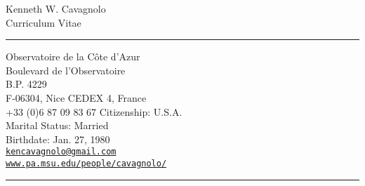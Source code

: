 \documentclass[12pt]{cv}
\begin{document}
\begin{center}
{\Large Kenneth W. Cavagnolo\\Curriculum Vitae}
\rule{\linewidth}{1pt}
\normalsize
\end{center}
\vspace{-0.5cm}
\addresses
{
Observatoire de la C\^ote d'Azur\\
Boulevard de l'Observatoire\\
B.P. 4229\\
F-06304, Nice CEDEX 4, France\\
+33 (0)6 87 09 83 67
}
{
Citizenship: U.S.A.\\
Marital Status: Married\\
Birthdate: Jan. 27\ths, 1980\\
\href{mailto:kencavagnolo@gmail.com}{\tt{kencavagnolo@gmail.com}}\\
\href{http://www.pa.msu.edu/people/cavagnolo/}{\tt www.pa.msu.edu/people/cavagnolo/}\\
}
\vspace{-0.5cm}
\rule{\linewidth}{1pt}
\end{document}
